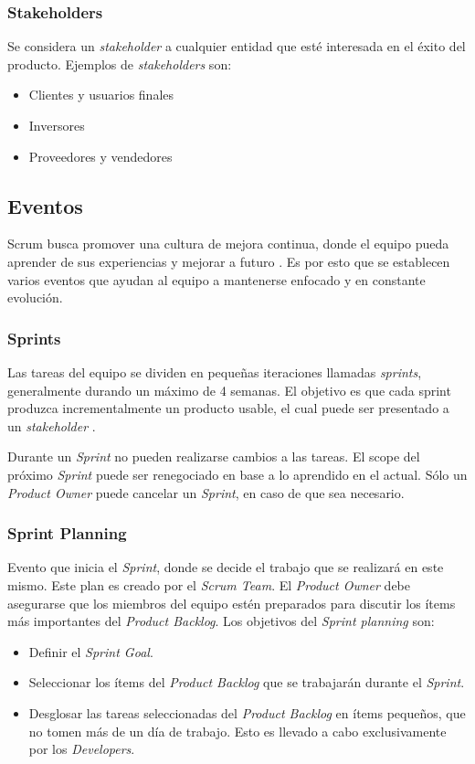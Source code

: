 \subsubsection{Stakeholders}
\par Se considera un \emph{stakeholder} a cualquier entidad que esté interesada en el éxito del producto. Ejemplos de \emph{stakeholders} son:
\begin{itemize}
  \item Clientes y usuarios finales
  \item Inversores
  \item Proveedores y vendedores
\end{itemize}
%
%
\subsection{Eventos}
\par Scrum busca promover una cultura de mejora continua, donde el equipo pueda aprender de sus experiencias y mejorar a futuro \cite{excelgchukwurahELEVATINGTEAMPERFORMANCE2024}. Es por esto que se establecen varios eventos que ayudan al equipo a mantenerse enfocado y en constante evolución.
%
\subsubsection{Sprints}
\par Las tareas del equipo se dividen en pequeñas iteraciones llamadas \emph{sprints}, generalmente durando un máximo de 4 semanas. El objetivo es que cada sprint produzca incrementalmente un producto usable, el cual puede ser presentado a un \emph{stakeholder} \cite{bartoszScrumVideoGames2023}.
\par Durante un \emph{Sprint} no pueden realizarse cambios a las tareas. El scope del próximo \emph{Sprint} puede ser renegociado en base a lo aprendido en el actual. Sólo un \emph{Product Owner} puede cancelar un \emph{Sprint}, en caso de que sea necesario.
%
\subsubsection{Sprint Planning}
\par Evento que inicia el \emph{Sprint}, donde se decide el trabajo que se realizará en este mismo. Este plan es creado por el \emph{Scrum Team}. El \emph{Product Owner} debe asegurarse que los miembros del equipo estén preparados para discutir los ítems más importantes del \emph{Product Backlog}. Los objetivos del \emph{Sprint planning} son:
\begin{itemize}
  \item Definir el \emph{Sprint Goal}.
  \item Seleccionar los ítems del \emph{Product Backlog} que se trabajarán durante el \emph{Sprint}.
  \item Desglosar las tareas seleccionadas del \emph{Product Backlog} en ítems pequeños, que no tomen más de un día de trabajo. Esto es llevado a cabo exclusivamente por los \emph{Developers}.
\end{itemize}
%
